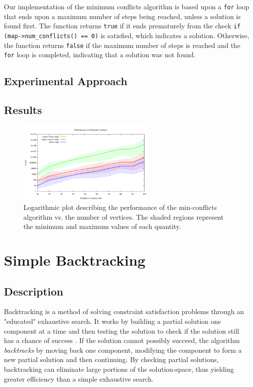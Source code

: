 \documentclass{article}
\begin{document}
		Our implementation of the minimum conflicts algorithm is based upon a \texttt{for} loop that ends upon a maximum number of steps being reached, unless a solution is found first.  The function returns \texttt{true} if it ends prematurely from the check \texttt{if (map->num\_conflicts() == 0)} is satisfied, which indicates a solution.  Otherwise, the function returns \texttt{false} if the maximum number of steps is reached and the \texttt{for} loop is completed, indicating that a solution was not found.
	\subsection{Experimental Approach}
	
	\subsection{Results}
	
			\begin{figure}[h!]
				\centering
				\includegraphics[width=0.6\textwidth]{../results_5/min_conflicts/min_conflicts_performance}
				\caption{Logarithmic plot describing the performance of the min-conflicts algorithm vs. the number of vertices. The shaded regions represent the minimum and maximum values of each quantity.}
			\end{figure}	

\section{Simple Backtracking}
	\subsection{Description}
		\label{simpe_desc}
		Backtracking is a method of solving constraint satisfaction problems through an "educated" exhaustive search. It works by building a partial solution one component at a time and then testing the solution to check if the solution still has a chance of success \cite{Golomb}. If the solution cannot possibly succeed, the algorithm \textit{backtracks} by moving back one component, modifying the component to form a new partial solution and then continuing. By checking partial solutions, backtracking can eliminate large portions of the solution-space, thus yielding greater efficiency than a simple exhaustive search.
		
\end{document}
